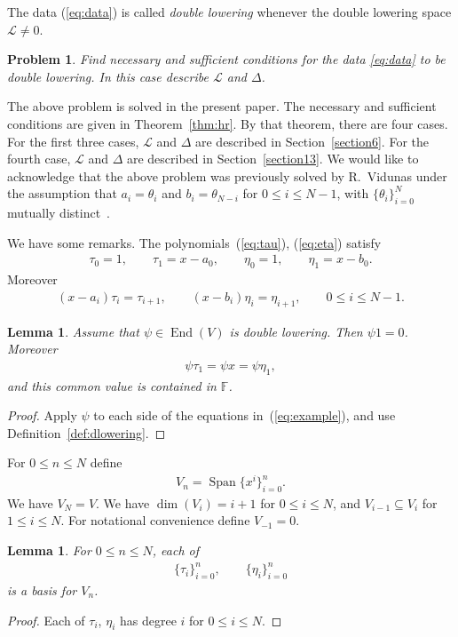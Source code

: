 \documentclass[pdftex]{sigma}
\numberwithin{equation}{section}
\newtheorem{Lemma}[Theorem]{Lemma}
\newtheorem{Problem}[Theorem]{Problem}
 { \theoremstyle{definition}
\newtheorem{Definition}[Theorem]{Definition}
\newtheorem{Note}[Theorem]{Note}
\newtheorem{Example}[Theorem]{Example}}
\begin{document}
\begin{Definition}\label{def:feasible} The data
(\ref{eq:data})
is called {\it double lowering} whenever the double lowering space
$\mathcal L \not=0$.
\end{Definition}

\begin{Problem} Find necessary and sufficient conditions
for the data
\eqref{eq:data}
to be double lowering. In this case describe
$\mathcal L$ and $\Delta$.
\end{Problem}

The above problem is solved in the present paper.
The necessary and sufficient conditions are given in
Theorem~\ref{thm:hr}. By that theorem, there are four cases.
For the first three cases, $\mathcal L$ and $\Delta$ are described
in Section~\ref{section6}. For the fourth case, $\mathcal L$ and $\Delta$
are described
in Section~\ref{section13}. We would like to acknowledge that the above
problem was previously solved by R.~Vidunas
under the assumption
that $a_i =\theta_i$ and $b_i=\theta_{N-i}$ for $0 \leq i \leq N-1$,
with $\lbrace \theta_i\rbrace_{i=0}^N$ mutually distinct~\cite{vidunas}.

We have some remarks. The polynomials~(\ref{eq:tau}), (\ref{eq:eta}) satisfy
\begin{gather}\label{eq:example}
\tau_0=1, \qquad
\tau_1=x-a_0, \qquad
\eta_0=1, \qquad
\eta_1=x-b_0.
\end{gather}
Moreover
\begin{gather}
 (x-a_i)\tau_i = \tau_{i+1}, \qquad
 (x-b_i)\eta_i = \eta_{i+1}, \qquad 0 \leq i \leq N-1.\label{eq:xrec}
\end{gather}

\begin{Lemma}\label{lem:dlcomment}Assume that $\psi \in \operatorname{End}(V)$ is double lowering. Then
$\psi 1 =0$. Moreover
\begin{gather}\label{eq:dlcomment}
\psi \tau_1 = \psi x = \psi \eta_1,
\end{gather}
and this common value is contained in $\mathbb F$.
\end{Lemma}
\begin{proof} Apply $\psi$ to each side of the equations in~(\ref{eq:example}), and use Definition~\ref{def:dlowering}.
\end{proof}

For $0 \leq n \leq N$ define
\begin{gather}
V_n = \operatorname{Span}\big\lbrace x^i \big\rbrace_{i=0}^{n}.\label{eq:Vn}
\end{gather}
We have $V_N=V$.
 We have $\dim (V_i)= i+1$ for $0 \leq i \leq N$,
and $V_{i-1} \subseteq V_i$ for $1 \leq i \leq N$.
For notational convenience define $V_{-1} = 0$.
\begin{Lemma}\label{lem:Vnbasis}
For $0 \leq n \leq N$,
each of
\begin{gather*}
\lbrace \tau_i \rbrace_{i=0}^{n},
\qquad
\lbrace \eta_i \rbrace_{i=0}^{n}
\end{gather*}
is a basis for $V_n$.
\end{Lemma}
\begin{proof} Each of $\tau_i$, $\eta_i$ has degree $i$ for $0 \leq i \leq N$.
\end{proof}
\end{document}
